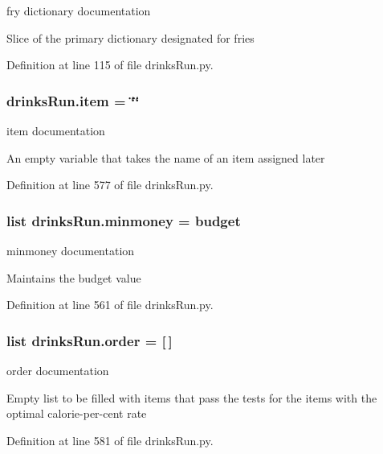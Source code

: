fry dictionary documentation 

Slice of the primary dictionary designated for fries 

Definition at line 115 of file drinks\-Run.\-py.

\hypertarget{namespacedrinksRun_a309ac6a752bb1991b98db6406c65f310}{
\subsubsection[{item}]{\setlength{\rightskip}{0pt plus 5cm}drinks\-Run.\-item = \char`\"{}\char`\"{}}}\label{namespacedrinksRun_a309ac6a752bb1991b98db6406c65f310}


item documentation 

An empty variable that takes the name of an item assigned later 

Definition at line 577 of file drinks\-Run.\-py.

\hypertarget{namespacedrinksRun_ae8aedc6e63d9f061186d07b66fa9c854}{
\subsubsection[{minmoney}]{\setlength{\rightskip}{0pt plus 5cm}list drinks\-Run.\-minmoney = {\bf budget}}}\label{namespacedrinksRun_ae8aedc6e63d9f061186d07b66fa9c854}


minmoney documentation 

Maintains the budget value 

Definition at line 561 of file drinks\-Run.\-py.

\hypertarget{namespacedrinksRun_a782f15bcfec0ee2dab26faf448338cd5}{
\subsubsection[{order}]{\setlength{\rightskip}{0pt plus 5cm}list drinks\-Run.\-order = \mbox{[}$\,$\mbox{]}}}\label{namespacedrinksRun_a782f15bcfec0ee2dab26faf448338cd5}


order documentation 

Empty list to be filled with items that pass the tests for the items with the optimal calorie-\/per-\/cent rate 

Definition at line 581 of file drinks\-Run.\-py.

